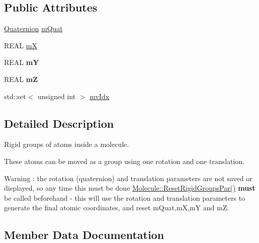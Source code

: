 \subsection*{Public Attributes}
\begin{DoxyCompactItemize}
\item 
\mbox{\hyperlink{class_obj_cryst_1_1_quaternion}{Quaternion}} \mbox{\hyperlink{class_obj_cryst_1_1_rigid_group_a65b5f08946d861618286787ac67ec2fb}{m\+Quat}}
\item 
R\+E\+AL \mbox{\hyperlink{class_obj_cryst_1_1_rigid_group_abda5125459a21cc5534c90d9516312e9}{mX}}
\item 
\mbox{\label{class_obj_cryst_1_1_rigid_group_a941525a36f26bb426fbbde9c1752c930}} 
R\+E\+AL {\bfseries mY}
\item 
\mbox{\label{class_obj_cryst_1_1_rigid_group_ac0d6341c324838a1868a6bf34e25d64d}} 
R\+E\+AL {\bfseries mZ}
\item 
std\+::set$<$ unsigned int $>$ \mbox{\hyperlink{class_obj_cryst_1_1_rigid_group_a5c24037c1724aa2e0060c9432f0ec907}{mv\+Idx}}
\end{DoxyCompactItemize}


\subsection{Detailed Description}
Rigid groups of atoms inside a molecule.

These atoms can be moved as a group using one rotation and one translation. \begin{DoxyWarning}{Warning}
\+: the rotation (quaternion) and translation parameters are not saved or displayed, so any time this must be done \mbox{\hyperlink{class_obj_cryst_1_1_molecule_aacd7668d81ffb43a889d6da6e07cde9b}{Molecule\+::\+Reset\+Rigid\+Groups\+Par()}} {\bfseries{must}} be called beforehand -\/ this will use the rotation and translation parameters to generate the final atomic coordinates, and reset m\+Quat,mX,mY and mZ. 
\end{DoxyWarning}


\subsection{Member Data Documentation}
\mbox{\label{class_obj_cryst_1_1_rigid_group_a65b5f08946d861618286787ac67ec2fb}} 

